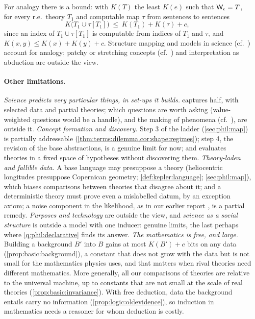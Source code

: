For analogy there is a bound: with $K(T)$ the least $K(e)$ such that $\mathsf{W}_{e}=T$, for every r.e.\ theory $T_1$ and computable map $\tau$ from sentences to sentences
\begin{equation}\label{eq:limits:analogy}
K\big(T_1\cup\tau[T_1]\big)\ \le\ K(T_1)+K(\tau)+c,
\end{equation}
since an index of $T_1\cup\tau[T_1]$ is computable from indices of $T_1$ and $\tau$, and $K(x,y)\le K(x)+K(y)+c$. Structure mapping \citep{gentner1983structure} and models in science (cf.\ \citealp{hesse1963models}) account for analogy; patchy or stretching concepts (cf.\ \citealp{wilson2006wandering,lakatos1976proofs}) and interpretation as abduction \citep{hobbs1993interpretation} are outside the view.

\paragraph{Other limitations.}\label{sec:limits:other}\emph{Science predicts very particular things, in set-ups it builds.} \SAIabbr captures half, with selected data and partial theories; which questions are worth asking (value-weighted questions would be a handle), and the making of phenomena (cf.\ \citealp{hacking1983representing}), are outside it. \emph{Concept formation and discovery.} Step 3 of the ladder (\cref{sec:phil:map}) is partially addressable (\cref{thm:terms:dilemma,cor:shape:regimes}); step 4, the revision of the base abstractions, is a genuine limit for now; and \SAIabbr evaluates theories in a fixed space of hypotheses without discovering them. \emph{Theory-laden and fallible data.} A base language may presuppose a theory (heliocentric longitudes presuppose Copernican geometry; \cref{def:kepler:language}; \cref{sec:phil:map}), which biases comparisons between theories that disagree about it; and a deterministic theory must prove even a mislabelled datum, by an exception axiom; a noise component in the likelihood, as in our earlier report \citep{claude2026axiominduction}, is a partial remedy. \emph{Purposes and technology} are outside the view, and \emph{science as a social structure} is outside a model with one inducer: genuine limits, the last perhaps where \cref{q:phil:declarative} finds its answer. \emph{The mathematics is free, and large.} Building a background $B'$ into $B$ gains at most $K(B')+c$ bits on any data (\cref{prop:basic:background}), a constant that does not grow with the data but is not small for the mathematics physics uses, and that matters when rival theories need different mathematics. More generally, all our comparisons of theories are relative to the universal machine, up to constants that are not small at the scale of real theories (\cref{prop:basic:invariance}). With free deduction, data the background entails carry no information (\cref{prop:logic:oldevidence}), so induction in mathematics needs a reasoner for whom deduction is costly.

